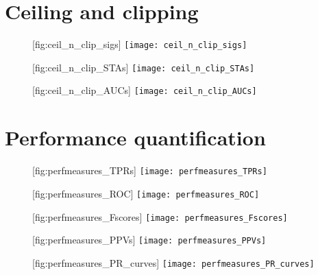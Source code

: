 \section{Ceiling and clipping}

\begin{figure}
    \begin{sidecaption}
        {}
        [fig:ceil_n_clip_sigs]
        \texttt{[image: ceil\_n\_clip\_sigs]}
    \end{sidecaption}
\end{figure}

\begin{figure}
    \begin{sidecaption}
        {}
        [fig:ceil_n_clip_STAs]
        \texttt{[image: ceil\_n\_clip\_STAs]}
    \end{sidecaption}
\end{figure}

\begin{figure}
    \begin{sidecaption}
        {}
        [fig:ceil_n_clip_AUCs]
        \texttt{[image: ceil\_n\_clip\_AUCs]}
    \end{sidecaption}
\end{figure}


\section{Performance quantification}

\begin{figure}
    \begin{sidecaption}
        {}
        [fig:perfmeasures_TPRs]
        \texttt{[image: perfmeasures\_TPRs]}
    \end{sidecaption}
\end{figure}

\begin{figure}
    \begin{sidecaption}
        {}
        [fig:perfmeasures_ROC]
        \texttt{[image: perfmeasures\_ROC]}
    \end{sidecaption}
\end{figure}

\begin{figure}
    \begin{sidecaption}
        {}
        [fig:perfmeasures_Fscores]
        \texttt{[image: perfmeasures\_Fscores]}
    \end{sidecaption}
\end{figure}

\begin{figure}
    \begin{sidecaption}
        {}
        [fig:perfmeasures_PPVs]
        \texttt{[image: perfmeasures\_PPVs]}
    \end{sidecaption}
\end{figure}

\begin{figure}
    \begin{sidecaption}
        {}
        [fig:perfmeasures_PR_curves]
        \texttt{[image: perfmeasures\_PR\_curves]}
    \end{sidecaption}
\end{figure}
